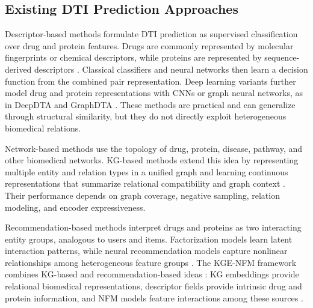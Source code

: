 \subsection{Existing DTI Prediction Approaches}

Descriptor-based methods formulate DTI prediction as supervised classification over drug and protein features. Drugs are commonly represented by molecular fingerprints or chemical descriptors, while proteins are represented by sequence-derived descriptors \cite{rogers2010extended,dubchak1995prediction}. Classical classifiers and neural networks then learn a decision function from the combined pair representation. Deep learning variants further model drug and protein representations with CNNs or graph neural networks, as in DeepDTA and GraphDTA \cite{ozturk2018deepdta,nguyen2021graphdta}. These methods are practical and can generalize through structural similarity, but they do not directly exploit heterogeneous biomedical relations.

Network-based methods use the topology of drug, protein, disease, pathway, and other biomedical networks. KG-based methods extend this idea by representing multiple entity and relation types in a unified graph and learning continuous representations that summarize relational compatibility and graph context \cite{luo2017network,wan2019neodti}. Their performance depends on graph coverage, negative sampling, relation modeling, and encoder expressiveness.

Recommendation-based methods interpret drugs and proteins as two interacting entity groups, analogous to users and items. Factorization models learn latent interaction patterns, while neural recommendation models capture nonlinear relationships among heterogeneous feature groups \cite{rendle2010factorization}. The KGE-NFM framework combines KG-based and recommendation-based ideas \cite{ye2021unified}: KG embeddings provide relational biomedical representations, descriptor fields provide intrinsic drug and protein information, and NFM models feature interactions among these sources \cite{0001C17}.
